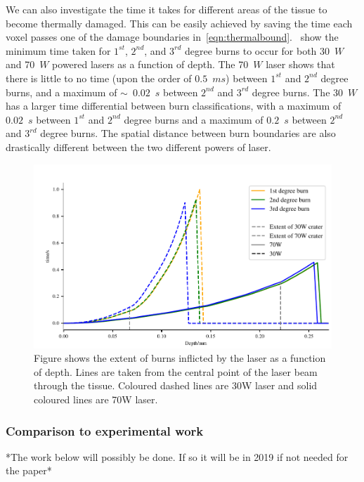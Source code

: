 \medskip

We can also investigate the time it takes for different areas of the tissue to become thermally damaged. This can be easily achieved by saving the time each voxel passes one of the damage boundaries in~\cref{eqn:thermalbound}.~ show the minimum time taken for $1^{st}$, $2^{nd}$, and $3^{rd}$ degree burns to occur for both 30~$W$ and 70~$W$ powered lasers as a function of depth. The 70~$W$ laser shows that there is little to no time (upon the order of $0.5$~$ms$) between $1^{st}$ and $2^{nd}$ degree burns, and a maximum of $\sim$~$0.02$~$s$ between $2^{nd}$ and $3^{rd}$ degree burns.
The 30~$W$ has a larger time differential between burn classifications, with a maximum of $0.02$~$s$ between $1^{st}$ and $2^{nd}$ degree burns and a maximum of $0.2$~$s$ between $2^{nd}$ and $3^{rd}$ degree burns.
The spatial distance between burn boundaries are also drastically different between the two different powers of laser.
	
\begin{figure}
	\centering
	\includegraphics[width=\columnwidth]{./ablation/images/time-thres.pdf}
	\caption{Figure shows the extent of burns inflicted by the laser as a function of depth. Lines are taken from the central point of the laser beam through the tissue. Coloured dashed lines are 30W laser and solid coloured lines are 70W laser.}
	\label{fig:time-thres}
\end{figure}	
	
\subsubsection{Comparison to experimental work} 
 
*The work below will possibly be done. If so it will be in 2019 if not needed for the paper*
